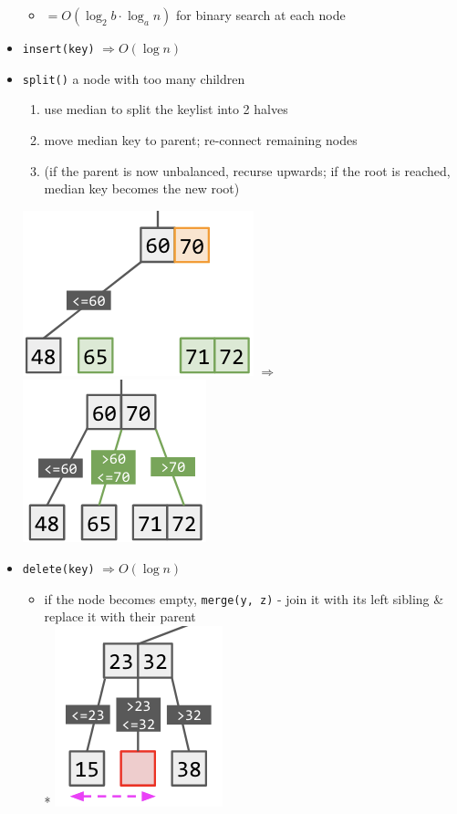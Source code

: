 \documentclass[10pt, landscape]{article}
\let\Then\Rightarrow
\newcommand{\code}[1]{\textcolor{myblue}{\texttt{#1}}}
\begin{document}
\begin{multicols}{4}
\begin{itemize}
    \begin{itemize}
        \item $= O(\log_2 b \cdot \log_a n)$ for binary search at each node
    \end{itemize}
    \item \code{insert(key)} $\Then O(\log n)$
    \item \code{split()} a node with too many children
    \begin{enumerate}
        \item use median to split the keylist into 2 halves
        \item move median key to parent; re-connect remaining nodes
        \item (if the parent is now unbalanced, recurse upwards; if the root is reached, median key becomes the new root)
    \end{enumerate}
    \includegraphics[width=0.35\linewidth]{cs2040s-abtree-split-1.png}
    $\Then$
    \includegraphics[width=0.28\linewidth]{cs2040s-abtree-split-2.png}
    \item \code{delete(key)} $\Then O(\log n)$
    \begin{itemize}
        \item if the node becomes empty, \code{merge(y, z)} - join it with its left sibling \& replace it with their parent
        \\* \includegraphics[width=0.25\linewidth]{cs2040s-abtree-delete-1.png}

\end{itemize}
\end{itemize}
\end{multicols}
\end{document}
